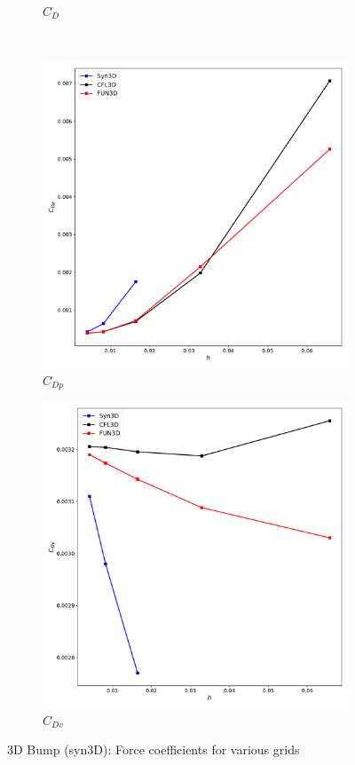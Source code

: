 \begin{figure}[ht!]
\begin{subfigure}{.45\textwidth}
  \caption{$C_D$}
\end{subfigure}
\\
\begin{subfigure}{.45\textwidth}
  \centering
  \includegraphics[width=1.0\textwidth]{figs/3dbump/C_Dp_GridStudy.pdf}
  \caption{$C_{Dp}$}
\end{subfigure}%
\begin{subfigure}{.45\textwidth}
  \centering
  \includegraphics[width=1.0\textwidth]{figs/3dbump/C_Dv_GridStudy.pdf}
  \caption{$C_{Dv}$}
\end{subfigure}
\caption{3D Bump (syn3D): Force coefficients for various grids}
\label{fig:syn3dbumpforces}
\end{figure}

